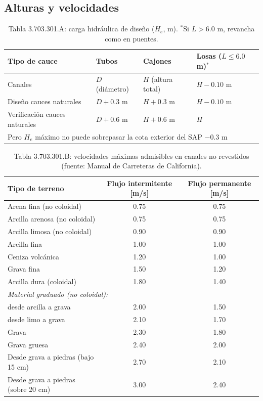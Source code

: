 \subsection{Alturas y velocidades}
\begin{table}[H]
\centering\small
\begin{tabular}{llll}
\toprule
\textbf{Tipo de cauce} & \textbf{Tubos} & \textbf{Cajones} & \textbf{Losas} ($L\leq6.0$ m)$^*$\\
\midrule
Canales & $D$ (diámetro) & $H$ (altura total) & $H-0.10$ m\\
Diseño cauces naturales & $D+0.3$ m & $H+0.3$ m & $H-0.10$ m\\
Verificación cauces naturales & $D+0.6$ m & $H+0.6$ m & $H$\\
\multicolumn{4}{l}{\quad Pero $H_e$ máximo no puede sobrepasar la cota exterior del SAP $-0.3$ m}\\
\bottomrule
\end{tabular}
\caption{Tabla 3.703.301.A: carga hidráulica de diseño ($H_e$, m).
$^*$Si $L>6.0$ m, revancha como en puentes.}
\end{table}

\begin{table}[H]
\centering\small
\begin{tabular}{lcc}
\toprule
\textbf{Tipo de terreno} & \textbf{Flujo intermitente} [m/s] & \textbf{Flujo permanente} [m/s]\\
\midrule
Arena fina (no coloidal) & 0.75 & 0.75\\
Arcilla arenosa (no coloidal) & 0.75 & 0.75\\
Arcilla limosa (no coloidal) & 0.90 & 0.90\\
Arcilla fina & 1.00 & 1.00\\
Ceniza volcánica & 1.20 & 1.00\\
Grava fina & 1.50 & 1.20\\
Arcilla dura (coloidal) & 1.80 & 1.40\\
\multicolumn{3}{l}{\emph{Material graduado (no coloidal):}}\\
\quad desde arcilla a grava & 2.00 & 1.50\\
\quad desde limo a grava & 2.10 & 1.70\\
Grava & 2.30 & 1.80\\
Grava gruesa & 2.40 & 2.00\\
Desde grava a piedras (bajo 15 cm) & 2.70 & 2.10\\
Desde grava a piedras (sobre 20 cm) & 3.00 & 2.40\\
\bottomrule
\end{tabular}
\caption{Tabla 3.703.301.B: velocidades máximas admisibles en canales no
revestidos (fuente: Manual de Carreteras de California).}
\end{table}
